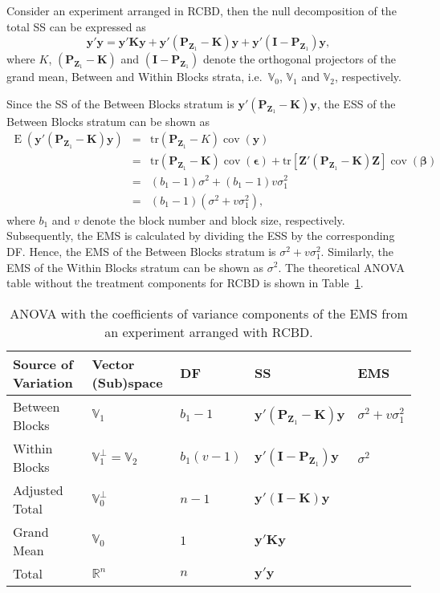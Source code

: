 \documentclass[article]{jss}
\newcommand{\mP}{\mathbf{P}}
\newcommand{\I}{\mathbf{I}}
\newcommand{\K}{\mathbf{K}}
\newcommand{\Z}{\mathbf{Z}}
\begin{document}
Consider an experiment arranged in RCBD, then the null decomposition of the total SS can be expressed as 
\begin{equation}
\label{eq:infoDecomp1}
\bm{y}'\bm{y} = \bm{y}'\K\bm{y} + \bm{y}'(\mP_{\Z_1}-\K)\bm{y} + \bm{y}'(\I - \mP_{\Z_1})\bm{y},
\end{equation}
where $K$, $(\mP_{\Z_1}-\K)$ and $(\I - \mP_{\Z_1})$ denote the orthogonal projectors of the grand mean, Between and Within Blocks strata, i.e.\ $\mathbb{V}_0$, $\mathbb{V}_1$ and $\mathbb{V}_2$, respectively. 

Since the SS of the Between Blocks stratum is $\bm{y}'(\mP_{\Z_1}-\K)\bm{y}$, the ESS of the Between Blocks stratum can be shown as 
\begin{eqnarray}
\nonumber \operatorname{E}(\bm{y}'(\mP_{\Z_1}-\K)\bm{y}) &=& \mathrm{tr}(\mP_{\Z_1}-K)\operatorname{cov}(\bm{y})\\
\nonumber &=& \mathrm{tr}(\mP_{\Z_1}-\K)\operatorname{cov}(\bm{\epsilon}) + \mathrm{tr}[\Z'(\mP_{\Z_1}-\K)\Z]\operatorname{cov}(\bm{\beta})\\ 
\nonumber &=& (b_1 - 1)\sigma^2 + (b_1 - 1)v\sigma^2_1\\
\label{eq:computRBD} &=& (b_1 - 1)(\sigma^2 +v\sigma^2_1),
\end{eqnarray}
where $b_1$ and $v$ denote the block number and block size, respectively. Subsequently, the EMS is calculated by dividing the ESS by the corresponding DF. Hence, the EMS of the Between Blocks stratum is $\sigma^2 +v\sigma^2_1$. Similarly, the EMS of the Within Blocks stratum can be shown as $\sigma^2$. The theoretical ANOVA table without the treatment components for RCBD is shown in Table~\ref{tab:infoDecomp}.

\begin{table}[ht]
\centering
\caption{ANOVA with the coefficients of variance components of the EMS from an experiment arranged with RCBD.}
\begin{tabular}[t]{lllll}
\toprule
 \multicolumn{1}{l}{\bf Source of Variation}& \multicolumn{1}{l}{\bf Vector (Sub)space} & \multicolumn{1}{l}{\bf DF} & \multicolumn{1}{l}{\bf SS} & \multicolumn{1}{l}{\bf EMS}\\
\midrule
Between Blocks 	& $\mathbb{V}_1$ &$b_1-1$ & $\bm{y}'(\mP_{\Z_1}-\K)\bm{y}$	& $\sigma^2 + v\sigma_{1}^2$\\
Within Blocks 	& $\mathbb{V}^{\perp}_1 = \mathbb{V}_2$	&$b_1(v - 1)$ & $\bm{y}'(\I - \mP_{\Z_1})\bm{y}$  & $\sigma^2$\\
\hline
Adjusted Total	& $\mathbb{V}^{\perp}_0$	& $n - 1$ & $\bm{y}'(\I - \K)\bm{y}$ \\
\hline
Grand Mean	& $\mathbb{V}_0$	& $1$ & $\bm{y}'\K\bm{y}$ \\
\midrule
Total 	& $\mathbb{R}^n$	& $n$ & $\bm{y}'\bm{y}$ \\
\bottomrule
\end{tabular}
\label{tab:infoDecomp}
\end{table}
\end{document}
